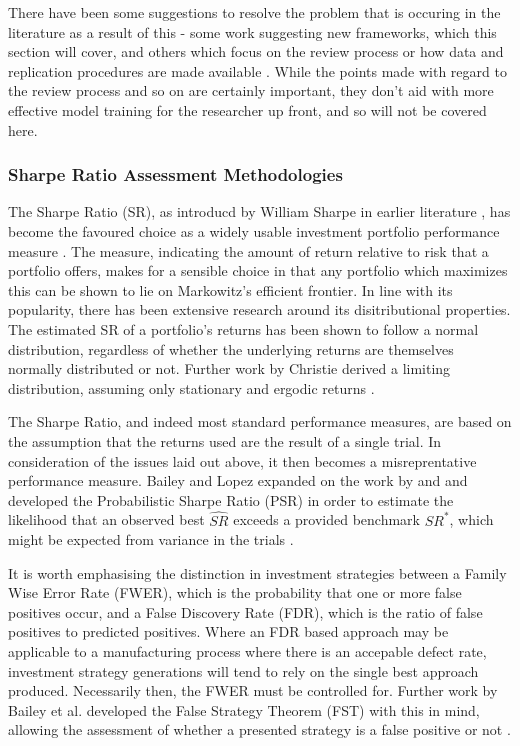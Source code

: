 \documentclass[a4paper,11pt,oneside]{article}
\theoremstyle{plain}
\theoremstyle{definition}
\begin{document}
	There have been some suggestions to resolve the problem that is occuring in the literature as a result of this - some 
	work suggesting new frameworks, which this section will cover, and others which focus on the review process or 
	how data and replication procedures are made available \cite{Prado}. While the points made with regard to the review process 
	and so on are certainly important, they don't aid with more effective model training for the researcher up front, and 
	so will not be covered here.
	
	\subsubsection{Sharpe Ratio Assessment Methodologies}\label{lr_backtest_sr}
	
	
	The Sharpe Ratio (SR), as introducd by William Sharpe in earlier literature \cite{Sharpe}, has become the favoured choice as a widely usable
	investment portfolio performance measure \cite{BaileyFrontier}. The measure, indicating the amount of return relative to risk that a portfolio offers, makes for 
	a sensible choice in that any portfolio which maximizes this can be shown to lie on Markowitz's efficient frontier. In line with its popularity, there has been 
	extensive research around its disitributional properties. The estimated SR of a portfolio's returns has been shown to follow a normal distribution, regardless
	of whether the underlying returns are themselves normally distributed or not. Further work by Christie derived a limiting distribution, assuming only stationary and ergodic returns \cite{Christie, Opdyke}.
		\hfill \break 
		
	The Sharpe Ratio, and indeed most standard performance measures, are based on the assumption that the returns used are the result of a single trial. In consideration of the issues laid out above, it then becomes a misreprentative performance measure. Bailey and Lopez expanded on the work by \cite{Christie} and \cite{Opdyke} and developed the Probabilistic Sharpe Ratio (PSR) in order to estimate the likelihood that an observed best $\widehat{SR}$ exceeds a provided benchmark $SR^{*}$, which might be expected from variance in the trials \cite{BaileyFrontier}. 
	\hfill \break 
	
	It is worth emphasising the distinction in investment strategies between a Family Wise Error Rate (FWER), which is the  probability that one or more false positives occur, and a False Discovery Rate (FDR), which is the ratio of false positives to predicted positives. Where an FDR based approach may be applicable to a manufacturing process where there is an accepable defect rate, investment strategy generations will tend to rely on the single best approach produced. Necessarily then, the FWER must be controlled for. Further work by Bailey et al. developed the False Strategy Theorem (FST) with this in mind, allowing the assessment of whether a presented strategy is a false positive or not \cite{BaileySharpe}.
		\hfill \break 
	
\end{document}
